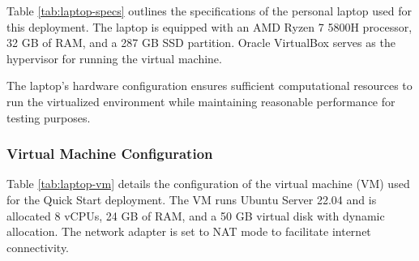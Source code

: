 Table \ref{tab:laptop-specs} outlines the specifications of the personal laptop used for this deployment. The laptop is equipped with an AMD Ryzen 7 5800H processor, 32 GB of RAM, and a 287 GB SSD partition. Oracle VirtualBox serves as the hypervisor for running the virtual machine.

\begin{table}[htbp]
    \centering
    \caption{Personal Laptop Specifications}
    \label{tab:laptop-specs}
\end{table}

The laptop's hardware configuration ensures sufficient computational resources to run the virtualized environment while maintaining reasonable performance for testing purposes.

\subsubsection{Virtual Machine Configuration}

Table \ref{tab:laptop-vm} details the configuration of the virtual machine (VM) used for the Quick Start deployment. The VM runs Ubuntu Server 22.04 and is allocated 8 vCPUs, 24 GB of RAM, and a 50 GB virtual disk with dynamic allocation. The network adapter is set to NAT mode to facilitate internet connectivity.

\begin{table}[htbp]
    \centering
    \caption{VM Configuration for Aether Quick Start Setup}
    \label{tab:laptop-vm}
\end{table}

